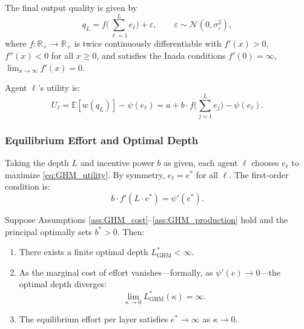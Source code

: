 \begin{assumption}\label{ass:GHM_production}
The final output quality is given by
\begin{equation}\label{eq:GHM_production}
q_L = f\Biggl(\sum_{\ell=1}^{L} e_\ell\Biggr) + \varepsilon, \qquad \varepsilon \sim \mathcal{N}(0, \sigma_\varepsilon^2),
\end{equation}
where $f: \mathbb{R}_+ \to \mathbb{R}_+$ is twice continuously differentiable with $f'(x) > 0$, $f''(x) < 0$ for all $x \geq 0$, and satisfies the Inada conditions $f'(0) = \infty$, $\lim_{x \to \infty} f'(x) = 0$.
\end{assumption}

Agent $\ell$'s utility is:
\begin{equation}\label{eq:GHM_utility}
U_\ell = \mathbb{E}[w(q_L)] - \psi(e_\ell) = a + b \cdot f\Biggl(\sum_{j=1}^{L} e_j\Biggr) - \psi(e_\ell).
\end{equation}

\subsubsection{Equilibrium Effort and Optimal Depth}

Taking the depth $L$ and incentive power $b$ as given, each agent $\ell$ chooses $e_\ell$ to maximize \eqref{eq:GHM_utility}. By symmetry, $e_\ell = e^*$ for all $\ell$. The first-order condition is:
\begin{equation}\label{eq:GHM_FOC}
b \cdot f'(L \cdot e^*) = \psi'(e^*).
\end{equation}

\begin{proposition}\label{prop:GHM_depth}
Suppose Assumptions \ref{ass:GHM_cost}--\ref{ass:GHM_production} hold and the principal optimally sets $b^* > 0$. Then:
\begin{enumerate}[label=(\roman*)]
\item There exists a finite optimal depth $L^*_{\text{GHM}} < \infty$.
\item As the marginal cost of effort vanishes---formally, as $\psi'(e) \to 0$---the optimal depth diverges:
\begin{equation}\label{eq:GHM_infinite_depth}
\lim_{\kappa \to 0} L^*_{\text{GHM}}(\kappa) = \infty.
\end{equation}
\item The equilibrium effort per layer satisfies $e^* \to \infty$ as $\kappa \to 0$.
\end{enumerate}
\end{proposition}

